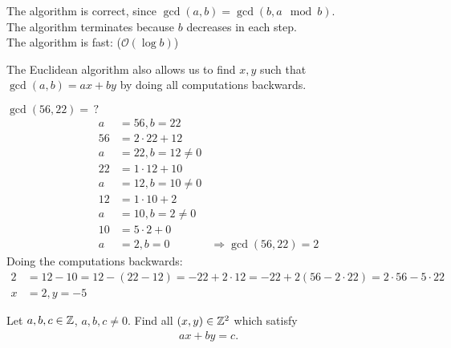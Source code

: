 \documentclass[NumTh.tex]{subfiles}
\begin{document}
The algorithm is correct, since $\gcd(a,b) = \gcd(b,a \mod b)$. \\
The algorithm terminates because $b$ decreases in each step. \\
The algorithm is fast: ($\mathcal{O}(\log b)$)


The Euclidean algorithm also allows us to find $x, y$ such that $\gcd(a,b) = ax+by$ by doing all computations backwards.

\begin{ex}
  $\gcd(56,22) = \,?$
  \begin{align*}
    a &= 56, b = 22\\
    56 &= 2 \cdot 22 + 12\\
    a &= 22, b = 12 \neq 0\\
    22 &= 1 \cdot 12 + 10\\
    a &= 12, b = 10 \neq 0\\
    12 &= 1 \cdot 10 + 2\\
    a &= 10, b = 2 \neq 0\\
    10 &= 5 \cdot 2 + 0\\
    a &= 2, b = 0 & \Rightarrow \gcd(56,22) = 2
  \end{align*}
  Doing the computations backwards:
  \begin{align*}
    2 &= 12 -10 = 12 - (22 - 12) = -22 + 2 \cdot 12 = -22 + 2(56-2 \cdot 22) = 2 \cdot 56 - 5 \cdot 22\\
    x &= 2, y = -5
  \end{align*}
\end{ex}

\begin{app*}
Let $a,b,c \in \mathbb{Z}$, $a,b,c \neq 0$. Find all $(x,y) \in \mathbb{Z}^2$ which satisfy
\begin{align}
  \label{eq:lde}
  ax+by = c.
\end{align}
\end{app*}
\end{document}
